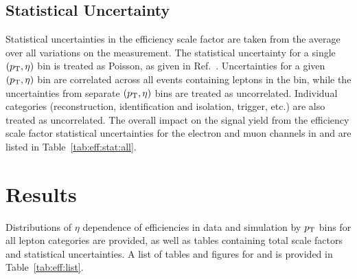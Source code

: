 \subsection{Statistical Uncertainty}
Statistical uncertainties in the efficiency scale factor are taken from the average over all variations on the measurement. The statistical uncertainty for a single $(p_{\mathrm{T}},\eta)$ bin is treated as Poisson, as given in Ref.~\cite{Paterno:2004cb}. Uncertainties for a given $(p_{\mathrm{T}},\eta)$ bin are correlated across all events containing leptons in the bin, while the uncertainties from separate $(p_{\mathrm{T}},\eta)$ bins are treated as uncorrelated. Individual categories (reconstruction, identification and isolation, trigger, etc.) are also treated as uncorrelated. The overall impact on the signal yield from the efficiency scale factor statistical uncertainties for the electron and muon channels in \sg and \sh are listed in Table~\ref{tab:eff:stat:all}.


% 
% 
% 
% 
% 
% 



\section{Results}\label{ch:eff:results}
Distributions of $\eta$ dependence of efficiencies in data and simulation by $p_{\mathrm{T}}$ bins for all lepton categories are provided, as well as tables containing total scale factors and statistical uncertainties. A list of tables and figures for \sg and \sh is provided in Table~\ref{tab:eff:list}.






